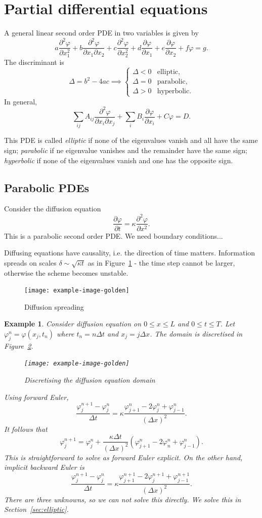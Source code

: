 \documentclass[11pt, a4paper]{article}
\renewcommand{\phi}{\varphi}
\theoremstyle{break}
\newtheorem{eg}[thm]{Example}
\newcommand*{\Paren}[1]{\left(#1\right)}%
\newcommand{\dt}{\Delta t}
\newcommand{\dx}{\Delta x}
\newcommand{\der}[2]{\frac{\partial #1}{\partial #2}}
\newcommand{\pder}[3][2]{\frac{\partial^#1 #2}{\partial #3^#1}}
\begin{document}
\section{Partial differential equations}
	A general linear second order PDE in two variables is given by \[a\pder\phi{x_1}+b\frac{\partial^2\phi}{\partial x_1\partial x_2}+c\pder\phi{x_2}+d\der\phi{x_1}+e\der\phi{x_2}+f\phi = g.\]
The discriminant is \[\Delta = b^2-4ac \implies \begin{cases}
	\Delta<0 & \text{elliptic},\\ \Delta =0& \text{parabolic}, \\\Delta>0 &\text{hyperbolic}.
\end{cases}\]
In general, \[\sum_{ij}A_{ij}\frac{\partial^2\phi}{\partial x_i\partial x_j}+\sum_i B_i\der\phi{x_i}+C\phi = D.\]

This PDE is called \emph{elliptic} if none of the eigenvalues vanish and all have the same sign; \emph{parabolic} if ne eigenvalue vanishes and the remainder have the same sign; \emph{hyperbolic} if none of the eigenvalues vanish and one has the opposite sign.

\subsection{Parabolic PDEs}

Consider the diffusion equation \[\der\phi t=\kappa\pder\phi x.\] This is a parabolic second order PDE. We need boundary conditions...

Diffusing equations have causality, i.e. the direction of time matters. Information spreads on scales $\delta\sim\sqrt{\kappa t}$ as in Figure~\ref{fig:diffusionTopHat} - the time step cannot be larger, otherwise the scheme becomes unstable.

\begin{figure}\centering
	\texttt{[image: example-image-golden]}
	\caption{Diffusion spreading}\label{fig:diffusionTopHat}
\end{figure}

\begin{eg}
	Consider diffusion equation on $0\leq x\leq L$ and $0\leq t\leq T$.  Let $\phi_j^n=\phi(x_j,t_n)$ where $t_n=n\dt$ and $x_j=j\dx$. The domain is discretised in Figure~\ref{fig:diffusionDiscret}.
	
	\begin{figure}\centering
		\texttt{[image: example-image-golden]}
		\caption{Discretising the diffusion equation domain}\label{fig:diffusionDiscret}
	\end{figure}
	
	Using forward Euler, \[\frac{\phi_j^{n+1}-\phi_j^n}{\dt}=\kappa\frac{\phi_{j+1}^n-2\phi_j^n+\phi^n_{j-1}}{(\dx)^2}.\] It follows that \[\phi_j^{n+1}=\phi_j^n+\frac{\kappa\dt}{(\dx)^2}\Paren{\phi_{j+1}^n-2\phi_n^n+\phi_{j-1}^n}.\] This is straightforward to solve as forward Euler explicit. On the other hand, implicit backward Euler is \[\frac{\phi_j^{n+1}-\phi_j^n}{\dt}=\kappa\frac{\phi_{j+1}^{n+1}-2\phi_j^{n+1}+\phi^{n+1}_{j-1}}{(\dx)^2}.\] There are three unknowns, so we can not solve this directly. We solve this in Section~\ref{sec:elliptic}.

\end{eg}
\end{document}
